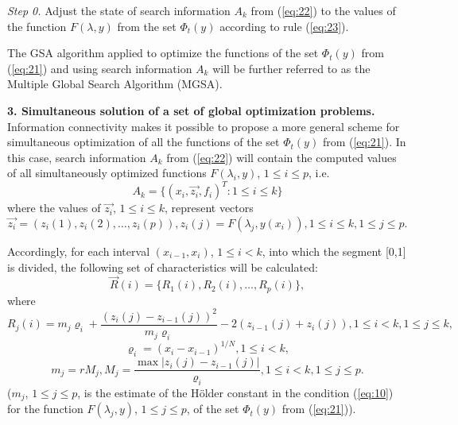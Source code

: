 \documentclass[runningheads]{llncs}
\begin{document}
\textit{Step 0.} Adjust the state of search information $A_k$ from (\ref{eq:22}) to the values of the function $F(\lambda, y)$ from the set $\Phi_t(y)$ according to rule (\ref{eq:23}).

The GSA algorithm applied to optimize the functions of the set $\Phi_t(y)$ from (\ref{eq:21}) and using search information $A_k$ will be further referred to as the Multiple Global Search Algorithm (MGSA).

\textbf{3. Simultaneous solution of a set of global optimization problems.} Information connectivity makes it possible to propose a more general scheme for simultaneous optimization of all the functions of the set $\Phi_t(y)$ from (\ref{eq:21}). In this case, search information $A_k$ from (\ref{eq:22}) will contain the computed values of all simultaneously optimized functions $F(\lambda_i, y)$, $1 \leq i \leq p$, i.e. 
\begin{equation}
\label{eq:24}
A_k=\{(x_i,\overrightarrow{z_i},f_i )^T : 1 \leq i \leq k\}
\end{equation}
where the values of $\overrightarrow{z_i}$, $1 \leq i \leq k$, represent vectors 
\begin{equation}
\label{eq:25}
\overrightarrow{z_i}=( z_i (1),z_i (2), \dots ,z_i (p)),z_i (j)=F(\lambda_j,y(x_i)), 1\leq i \leq k,1\leq j\leq p.
\end{equation}

Accordingly, for each interval $(x_{i-1},x_i)$, $1 \leq i < k$, into which the segment [0,1] is divided, the following set of characteristics will be calculated:
\begin{equation}
\label{eq:26}
\overrightarrow{R}(i)=\{R_1(i), R_2(i), \dots, R_p(i)\},
\end{equation}
where
\begin{equation}
\label{eq:27}
R_j(i)=m_j \varrho_i+\frac{(z_i(j)-z_{i-1}(j))^2}{m_j \varrho_i} - 2(z_{i-1}(j)+z_i(j)),1 \leq i < k,1 \leq j \leq k,
\end{equation}
\begin{equation}
\label{eq:28}
\varrho_i=(x_i-x_{i-1} )^{1/N}  ,1 \leq i<k,
\end{equation}
\begin{equation}
\label{eq:29}
m_j = r M_j, M_j=\frac{\max|z_i (j)-z_{i-1} (j)|}{\varrho_i} ,1\leq i < k, 1 \leq j \leq p.
\end{equation}
($m_j$, $1 \leq j \leq p$, is the estimate of the H{\"o}lder  constant in the condition (\ref{eq:10}) for the function $F(\lambda_j,y)$, $1 \leq j \leq p$, of the set $\Phi_t(y)$ from (\ref{eq:21})).
\end{document}
